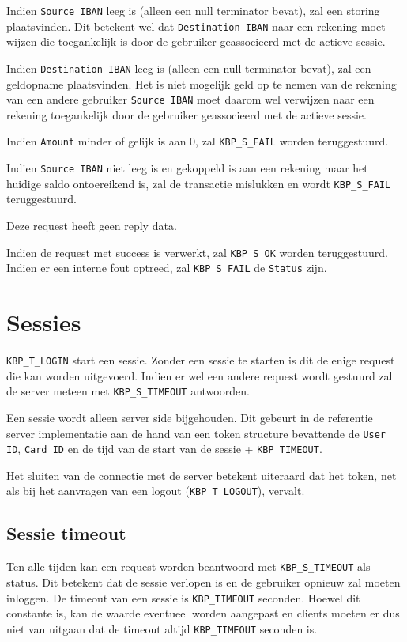 \documentclass[11pt,a4paper]{article}
\begin{document}
Indien \texttt{Source IBAN} leeg is (alleen een null terminator bevat), zal een
storing plaatsvinden. Dit betekent wel dat \texttt{Destination IBAN} naar een
rekening moet wijzen die toegankelijk is door de gebruiker geassocieerd met de
actieve sessie.

Indien \texttt{Destination IBAN} leeg is (alleen een null terminator bevat), zal
een geldopname plaatsvinden. Het is niet mogelijk geld op te nemen van de
rekening van een andere gebruiker \texttt{Source IBAN} moet daarom wel verwijzen
naar een rekening toegankelijk door de gebruiker geassocieerd met de actieve
sessie.

Indien \texttt{Amount} minder of gelijk is aan 0, zal \texttt{KBP\_S\_FAIL}
worden teruggestuurd.

Indien \texttt{Source IBAN} niet leeg is en gekoppeld is aan een rekening maar
het huidige saldo ontoereikend is, zal de transactie mislukken en wordt
\texttt{KBP\_S\_FAIL} teruggestuurd.

Deze request heeft geen reply data.

Indien de request met success is verwerkt, zal \texttt{KBP\_S\_OK} worden
teruggestuurd. Indien er een interne fout optreed, zal \texttt{KBP\_S\_FAIL} de
\texttt{Status} zijn.


\section{Sessies}
\label{sec:sessies}
\texttt{KBP\_T\_LOGIN} start een sessie. Zonder een sessie te starten is dit de
enige request die kan worden uitgevoerd. Indien er wel een andere request wordt
gestuurd zal de server meteen met \texttt{KBP\_S\_TIMEOUT} antwoorden.

Een sessie wordt alleen server side bijgehouden. Dit gebeurt in de referentie
server implementatie aan de hand van een token structure bevattende de
\texttt{User ID}, \texttt{Card ID} en de tijd van de start van de sessie +
\texttt{KBP\_TIMEOUT}.

Het sluiten van de connectie met de server betekent uiteraard dat het token, net
als bij het aanvragen van een logout (\texttt{KBP\_T\_LOGOUT}), vervalt.

\subsection{Sessie timeout}
Ten alle tijden kan een request worden beantwoord met \texttt{KBP\_S\_TIMEOUT}
als status. Dit betekent dat de sessie verlopen is en de gebruiker opnieuw zal
moeten inloggen. De timeout van een sessie is \texttt{KBP\_TIMEOUT} seconden.
Hoewel dit constante is, kan de waarde eventueel worden aangepast en clients
moeten er dus niet van uitgaan dat de timeout altijd \texttt{KBP\_TIMEOUT}
seconden is.
\end{document}
